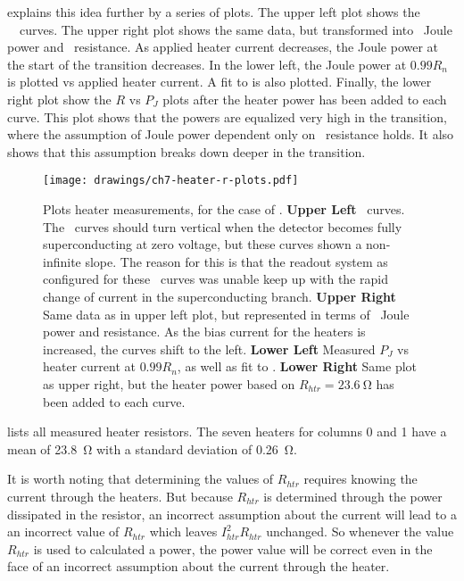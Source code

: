  explains this idea further by a series of plots.
The upper left plot shows the \TES\ \IV\ curves.
The upper right plot shows the same data, but transformed into \TES\ Joule power and \TES\ resistance.
As applied heater current decreases, the Joule power at the start of the transition decreases.
In the lower left, the Joule power at $0.99R_{n}$ is plotted vs applied heater current.
A fit to  is also plotted.
Finally, the lower right plot show the $R$ vs $P_J$ plots after the heater power has been added to each curve.
This plot shows that the powers are equalized very high in the transition, where the assumption of Joule power dependent only on \TES\ resistance holds.
It also shows that this assumption breaks down deeper in the transition.

\begin{figure*}
\texttt{[image: drawings/ch7-heater-r-plots.pdf]}
\caption{Plots heater measurements, for the case of .
\textbf{Upper Left} \IV\ curves. The \IV\ curves should turn vertical when the detector becomes fully superconducting at zero voltage, but these curves shown a non-infinite slope. The reason for this is that the readout system as configured for these \IV\ curves was unable keep up with the rapid change of current in the superconducting branch.
\textbf{Upper Right} Same data as in upper left plot, but represented in terms of \TES\ Joule power and resistance. As the bias current for the heaters is increased, the curves shift to the left.
\textbf{Lower Left} Measured $P_{J}$ vs heater current at $0.99R_n$, as well as fit to .
\textbf{Lower Right} Same plot as upper right, but the heater power based on $R_{htr} = \SI{23.6}{\ohm}$ has been added to each curve.}
\label{fig:ch7-heater-r-plots}
\end{figure*}

 lists all measured heater resistors.
The seven heaters for columns 0 and 1 have a mean of \SI{23.8}{\ohm} with a standard deviation of \SI{0.26}{\ohm}.

It is worth noting that determining the values of $R_{htr}$ requires knowing the current through the heaters.
But because $R_{htr}$ is determined through the power dissipated in the resistor, an incorrect assumption about the current will lead to a an incorrect value of $R_{htr}$ which leaves $I_{htr}^2 R_{htr}$ unchanged.
So whenever the value $R_{htr}$ is used to calculated a power, the power value will be correct even in the face of an incorrect assumption about the current through the heater.


